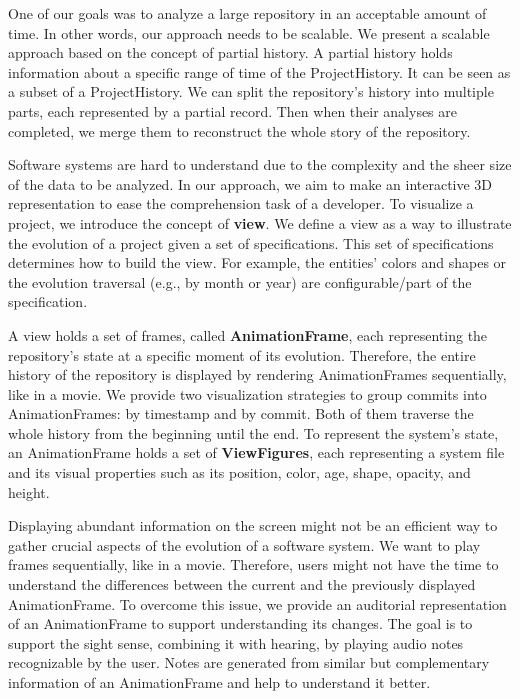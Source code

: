\documentclass[11pt,twoside,english,singlespacing,headsepline,consistentlayout]{auxiliary/si-msc-thesis}
\begin{document}
One of our goals was to analyze a large repository in an acceptable amount of time. 
In other words, our approach needs to be scalable. We present a scalable approach based on the concept of partial history.
A partial history holds information about a specific range of time of the ProjectHistory. 
It can be seen as a subset of a ProjectHistory. 
We can split the repository's history into multiple parts, each represented by a partial record. Then when their analyses are completed, we merge them to reconstruct the whole story of the repository.

Software systems are hard to understand due to the complexity and the sheer size of the data to be analyzed.
In our approach, we aim to make an interactive 3D representation to ease the comprehension task of a developer. 
To visualize a project, we introduce the concept of \textbf{view}. We define a view as a way to illustrate the evolution of a project given a set of specifications. This set of specifications determines how to build the view. For example, the entities' colors and shapes or the evolution traversal (e.g., by month or year) are configurable/part of the specification.

A view holds a set of frames, called \textbf{AnimationFrame}, each representing the repository's state at a specific moment of its evolution. Therefore, the entire history of the repository is displayed by rendering AnimationFrames sequentially, like in a movie. 
We provide two visualization strategies to group commits into AnimationFrames: by timestamp and by commit. Both of them traverse the whole history from the beginning until the end.
To represent the system's state, an AnimationFrame holds a set of \textbf{ViewFigures}, each representing a system file and its visual properties such as its position, color, age, shape, opacity, and height.

Displaying abundant information on the screen might not be an efficient way to gather crucial aspects of the evolution of a software system. We want to play frames sequentially, like in a movie. Therefore, users might not have the time to understand the differences between the current and the previously displayed AnimationFrame. To overcome this issue, we provide an auditorial representation of an AnimationFrame to support understanding its changes. The goal is to support the sight sense, combining it with hearing, by playing audio notes recognizable by the user. Notes are generated from similar but complementary information of an AnimationFrame and help to understand it better. 
\end{document}
